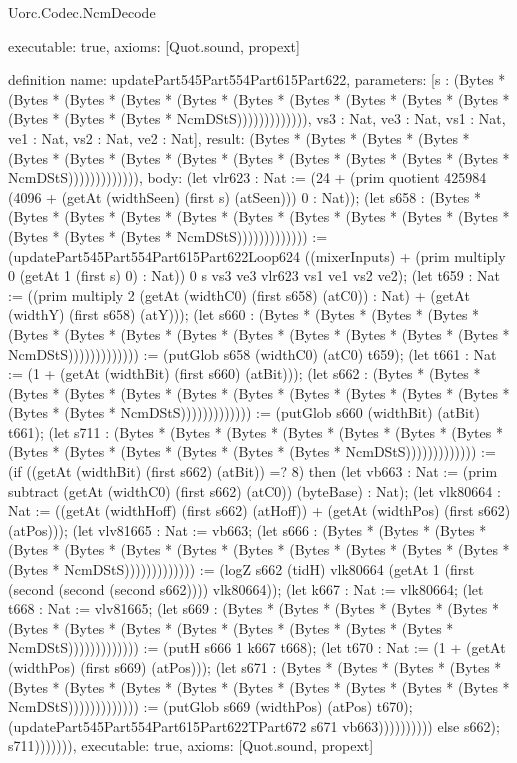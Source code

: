 \begin{lexlean}{Uorc.Codec.NcmDecode}
\begin{semanticmodule}
{  executable: true,
  axioms: [Quot.sound, propext]
}

definition{
  name: updatePart545Part554Part615Part622,
  parameters: [s : (Bytes * (Bytes * (Bytes * (Bytes * (Bytes * (Bytes * (Bytes * (Bytes * (Bytes * (Bytes * (Bytes * (Bytes * (Bytes * NcmDStS))))))))))))), vs3 : Nat, ve3 : Nat, vs1 : Nat, ve1 : Nat, vs2 : Nat, ve2 : Nat],
  result: (Bytes * (Bytes * (Bytes * (Bytes * (Bytes * (Bytes * (Bytes * (Bytes * (Bytes * (Bytes * (Bytes * (Bytes * (Bytes * NcmDStS))))))))))))),
  body: (let vlr623 : Nat := (24 + (prim quotient 425984 (4096 + (getAt (widthSeen) (first s) (atSeen))) 0 : Nat)); (let s658 : (Bytes * (Bytes * (Bytes * (Bytes * (Bytes * (Bytes * (Bytes * (Bytes * (Bytes * (Bytes * (Bytes * (Bytes * (Bytes * NcmDStS))))))))))))) := (updatePart545Part554Part615Part622Loop624 ((mixerInputs) + (prim multiply 0 (getAt 1 (first s) 0) : Nat)) 0 s vs3 ve3 vlr623 vs1 ve1 vs2 ve2); (let t659 : Nat := ((prim multiply 2 (getAt (widthC0) (first s658) (atC0)) : Nat) + (getAt (widthY) (first s658) (atY))); (let s660 : (Bytes * (Bytes * (Bytes * (Bytes * (Bytes * (Bytes * (Bytes * (Bytes * (Bytes * (Bytes * (Bytes * (Bytes * (Bytes * NcmDStS))))))))))))) := (putGlob s658 (widthC0) (atC0) t659); (let t661 : Nat := (1 + (getAt (widthBit) (first s660) (atBit))); (let s662 : (Bytes * (Bytes * (Bytes * (Bytes * (Bytes * (Bytes * (Bytes * (Bytes * (Bytes * (Bytes * (Bytes * (Bytes * (Bytes * NcmDStS))))))))))))) := (putGlob s660 (widthBit) (atBit) t661); (let s711 : (Bytes * (Bytes * (Bytes * (Bytes * (Bytes * (Bytes * (Bytes * (Bytes * (Bytes * (Bytes * (Bytes * (Bytes * (Bytes * NcmDStS))))))))))))) := (if ((getAt (widthBit) (first s662) (atBit)) =? 8) then (let vb663 : Nat := (prim subtract (getAt (widthC0) (first s662) (atC0)) (byteBase) : Nat); (let vlk80664 : Nat := ((getAt (widthHoff) (first s662) (atHoff)) + (getAt (widthPos) (first s662) (atPos))); (let vlv81665 : Nat := vb663; (let s666 : (Bytes * (Bytes * (Bytes * (Bytes * (Bytes * (Bytes * (Bytes * (Bytes * (Bytes * (Bytes * (Bytes * (Bytes * (Bytes * NcmDStS))))))))))))) := (logZ s662 (tidH) vlk80664 (getAt 1 (first (second (second (second s662)))) vlk80664)); (let k667 : Nat := vlk80664; (let t668 : Nat := vlv81665; (let s669 : (Bytes * (Bytes * (Bytes * (Bytes * (Bytes * (Bytes * (Bytes * (Bytes * (Bytes * (Bytes * (Bytes * (Bytes * (Bytes * NcmDStS))))))))))))) := (putH s666 1 k667 t668); (let t670 : Nat := (1 + (getAt (widthPos) (first s669) (atPos))); (let s671 : (Bytes * (Bytes * (Bytes * (Bytes * (Bytes * (Bytes * (Bytes * (Bytes * (Bytes * (Bytes * (Bytes * (Bytes * (Bytes * NcmDStS))))))))))))) := (putGlob s669 (widthPos) (atPos) t670); (updatePart545Part554Part615Part622TPart672 s671 vb663)))))))))) else s662); s711))))))),
  executable: true,
  axioms: [Quot.sound, propext]
}


\end{semanticmodule}
\end{lexlean}
